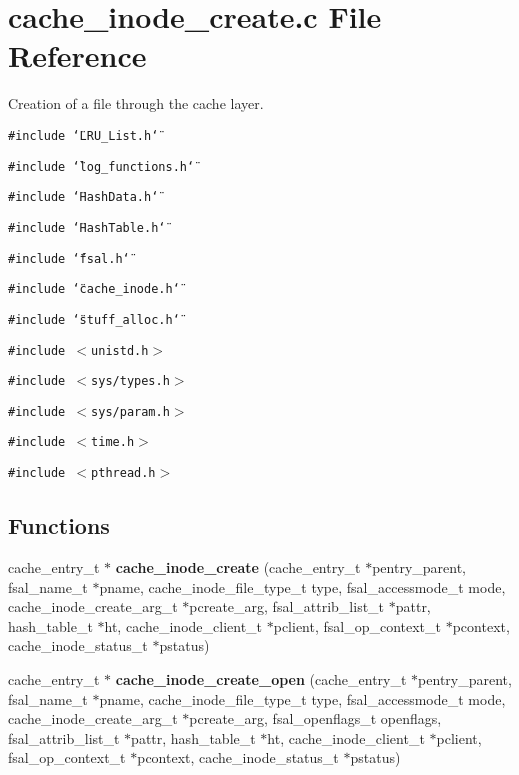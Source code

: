 \section{cache\_\-inode\_\-create.c File Reference}
\label{cache__inode__create_8c}
Creation of a file through the cache layer.  


{\tt \#include \char`\"{}LRU\_\-List.h\char`\"{}}\par
{\tt \#include \char`\"{}log\_\-functions.h\char`\"{}}\par
{\tt \#include \char`\"{}HashData.h\char`\"{}}\par
{\tt \#include \char`\"{}HashTable.h\char`\"{}}\par
{\tt \#include \char`\"{}fsal.h\char`\"{}}\par
{\tt \#include \char`\"{}cache\_\-inode.h\char`\"{}}\par
{\tt \#include \char`\"{}stuff\_\-alloc.h\char`\"{}}\par
{\tt \#include $<$unistd.h$>$}\par
{\tt \#include $<$sys/types.h$>$}\par
{\tt \#include $<$sys/param.h$>$}\par
{\tt \#include $<$time.h$>$}\par
{\tt \#include $<$pthread.h$>$}\par
\subsection*{Functions}
\begin{CompactItemize}
\item 
cache\_\-entry\_\-t $\ast$ {\bf cache\_\-inode\_\-create} (cache\_\-entry\_\-t $\ast$pentry\_\-parent, fsal\_\-name\_\-t $\ast$pname, cache\_\-inode\_\-file\_\-type\_\-t type, fsal\_\-accessmode\_\-t mode, cache\_\-inode\_\-create\_\-arg\_\-t $\ast$pcreate\_\-arg, fsal\_\-attrib\_\-list\_\-t $\ast$pattr, hash\_\-table\_\-t $\ast$ht, cache\_\-inode\_\-client\_\-t $\ast$pclient, fsal\_\-op\_\-context\_\-t $\ast$pcontext, cache\_\-inode\_\-status\_\-t $\ast$pstatus)
\item 
cache\_\-entry\_\-t $\ast$ {\bf cache\_\-inode\_\-create\_\-open} (cache\_\-entry\_\-t $\ast$pentry\_\-parent, fsal\_\-name\_\-t $\ast$pname, cache\_\-inode\_\-file\_\-type\_\-t type, fsal\_\-accessmode\_\-t mode, cache\_\-inode\_\-create\_\-arg\_\-t $\ast$pcreate\_\-arg, fsal\_\-openflags\_\-t openflags, fsal\_\-attrib\_\-list\_\-t $\ast$pattr, hash\_\-table\_\-t $\ast$ht, cache\_\-inode\_\-client\_\-t $\ast$pclient, fsal\_\-op\_\-context\_\-t $\ast$pcontext, cache\_\-inode\_\-status\_\-t $\ast$pstatus)
\end{CompactItemize}


